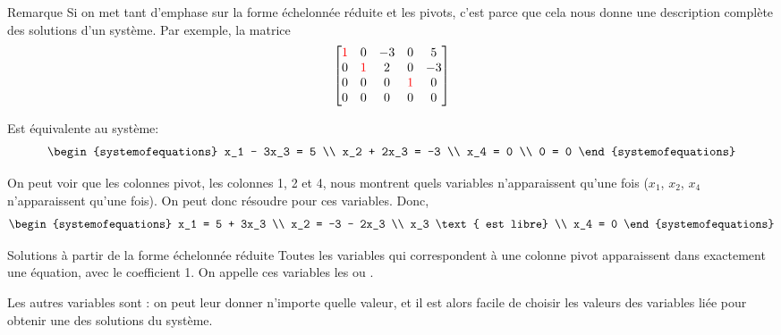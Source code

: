 \documentclass{article}
\begin{document}
\begin{parag}{Remarque}
    Si on met tant d'emphase sur la forme échelonnée réduite et les pivots, c'est parce que cela nous donne une description complète des solutions d'un système. Par exemple, la matrice
    \[\begin{bmatrix} \color{red}{1} & 0 & -3 & 0 & 5 \\ 0 & \color{red}{1} & 2 & 0 & -3 \\ 0 & 0 & 0 & \color{red}{1} & 0 \\ 0 & 0 & 0 & 0 & 0 \end{bmatrix} \]

    Est équivalente au système:
    \[\begin{systemofequations}
    x_1 - 3x_3 = 5 \\
    x_2 + 2x_3 = -3 \\
    x_4 = 0 \\
    0 = 0
    \end{systemofequations}\]

    On peut voir que les colonnes pivot, les colonnes 1, 2 et 4, nous montrent quels variables n'apparaissent qu'une fois ($x_1$, $x_2$, $x_4$ n'apparaissent qu'une fois). On peut donc résoudre pour ces variables. Donc,
    \[\begin{systemofequations}
    x_1 = 5 + 3x_3 \\
    x_2 = -3 - 2x_3 \\
    x_3 \text{ est libre} \\
    x_4 = 0
    \end{systemofequations}\]
\end{parag}

\begin{parag}{Solutions à partir de la forme échelonnée réduite}
    Toutes les variables qui correspondent à une colonne pivot apparaissent dans exactement une équation, avec le coefficient 1. On appelle ces variables les  ou .

    Les autres variables sont  : on peut leur donner n'importe quelle valeur, et il est alors facile de choisir les valeurs des variables liée pour obtenir une des solutions du système.
\end{parag}
\end{document}

